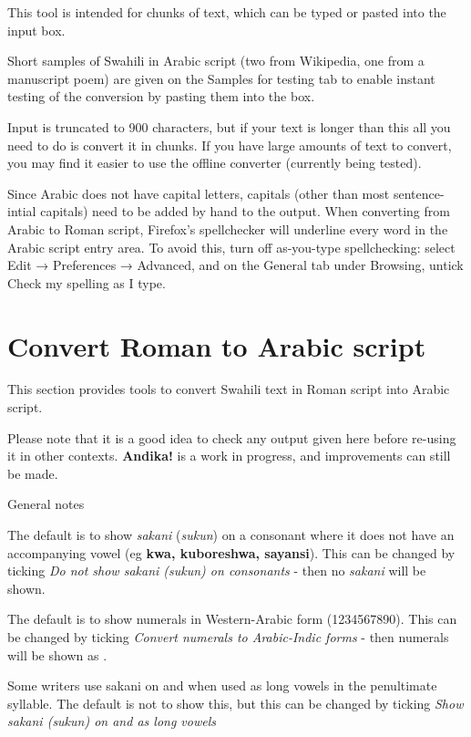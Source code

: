 \documentclass[a4paper,10pt, oneside]{book}
\newcommand\AS[1]{{\citationfont\RLE{#1}}}
\begin{document}
This tool is intended for chunks of text, which can be typed or pasted into the input box.

Short samples of Swahili in Arabic script (two from Wikipedia, one from a manuscript poem) are given on the Samples for testing tab to enable instant testing of the conversion by pasting them into the box.

Input is truncated to 900 characters, but if your text is longer than this all you need to do is convert it in chunks. If you have large amounts of text to convert, you may find it easier to use the offline converter (currently being tested).

Since Arabic does not have capital letters, capitals (other than most sentence-intial capitals) need to be added by hand to the output.
When converting from Arabic to Roman script, Firefox's spellchecker will underline every word in the Arabic script entry area. To avoid this, turn off as-you-type spellchecking: select Edit → Preferences → Advanced, and on the General tab under Browsing, untick Check my spelling as I type.


\chapter{Convert Roman to Arabic script}

This section provides tools to convert Swahili text in Roman script into Arabic script.

Please note that it is a good idea to check any output given here before re-using it in other contexts. \textbf{Andika!} is a work in progress, and improvements can still be made.

General notes

The default is to show \textit{sakani} (\textit{sukun}) on a consonant where it does not have an accompanying vowel (eg \textbf{kwa, kuboreshwa, sayansi}). This can be changed by ticking \textit{Do not show sakani (sukun) on consonants} - then no \textit{sakani} will be shown.

The default is to show numerals in Western-Arabic form (1234567890). This can be changed by ticking \textit{Convert numerals to Arabic-Indic forms} - then numerals will be shown as \AS{١٢٣٤٥٦٧٨٩٠}.

Some writers use sakani on \AS{و} and \AS{ي} when used as long vowels in the penultimate syllable. The default is not to show this, but this can be changed by ticking \textit{Show sakani (sukun) on \AS{و} and \AS{ي} as long vowels}
\end{document}

